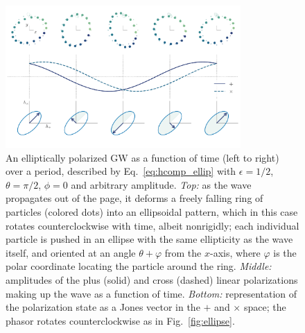 \documentclass[aps,prd,twocolumn,superscriptaddress,preprintnumbers,floatfix,nofootinbib]{revtex4-2}
\begin{document}
\begin{figure}
\includegraphics[width=0.8\textwidth]{pol_diagram_ellip}
\caption{An elliptically polarized GW as a function of time (left to right) over a period, described by Eq.~\eqref{eq:hcomp_ellip} with $\epsilon=1/2$, $\theta=\pi/2$, $\phi=0$ and arbitrary amplitude. \emph{Top:} as the wave propagates out of the page, it deforms a freely falling ring of particles (colored dots) into an ellipsoidal pattern, which in this case rotates counterclockwise with time, albeit nonrigidly; each individual particle is pushed in an ellipse with the same ellipticity as the wave itself, and oriented at an angle $\theta + \varphi$ from the $x$-axis, where $\varphi$ is the polar coordinate locating the particle around the ring.
\emph{Middle:} amplitudes of the plus (solid) and cross (dashed) linear polarizations making up the wave as a function of time.
\emph{Bottom:} representation of the polarization state as a Jones vector in the $+$ and $\times$ space; the phasor rotates counterclockwise as in Fig.~\ref{fig:ellipse}.
}
\label{fig:pol_diagram_ellip}
\end{figure}

\newcommand{\jonesbasis}{\vec{\mathfrak{e}}}
\end{document}
